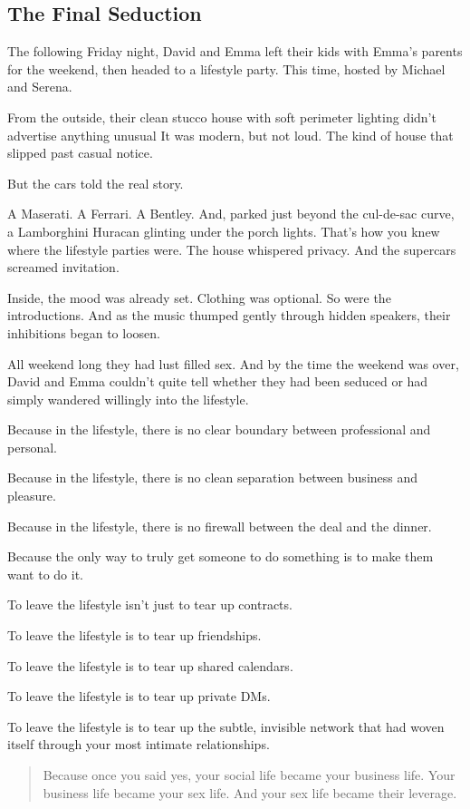 
\subsection{The Final Seduction}

The following Friday night, David and Emma left their kids with Emma's parents for the weekend,
then headed to a lifestyle party. This time, hosted by Michael and Serena.

From the outside, their clean stucco house with soft perimeter lighting didn’t advertise anything unusual
It was modern, but not loud. The kind of house that slipped past casual notice.

But the cars told the real story.

A Maserati. A Ferrari. A Bentley. And, parked just beyond the cul-de-sac curve, a Lamborghini Huracan glinting 
under the porch lights.
That’s how you knew where the lifestyle parties were. The house whispered privacy. And the supercars screamed 
invitation.

Inside, the mood was already set. Clothing was optional. So were the introductions.
And as the music thumped gently through hidden speakers, their inhibitions began to loosen.

All weekend long they had lust filled sex. And by the time the weekend was over, David and 
Emma couldn’t quite tell whether they had been seduced or had simply wandered willingly into the lifestyle.

Because in the lifestyle, there is no clear boundary between professional and personal.  

Because in the lifestyle, there is no clean separation between business and pleasure.  

Because in the lifestyle, there is no firewall between the deal and the dinner.

Because the only way to truly get someone to do something is to make them want to do it.

To leave the lifestyle isn’t just to tear up contracts.

To leave the lifestyle is to tear up friendships.  

To leave the lifestyle is to tear up shared calendars.  

To leave the lifestyle is to tear up private DMs.  

To leave the lifestyle is to tear up the subtle, invisible network that had woven itself through your 
most intimate relationships.

\begin{quote}
Because once you said yes,  
your social life became your business life.  
Your business life became your sex life.  
And your sex life became their leverage.
\end{quote}

